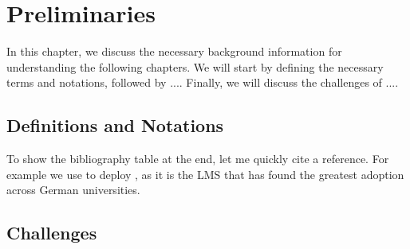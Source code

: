\documentclass[../paper.tex]{subfiles}
\begin{document}
    \section{Preliminaries}\label{ch:preliminaries}
    In this chapter, we discuss the necessary background information for understanding the following chapters. We will start by defining the necessary terms and notations, followed by .... Finally, we will discuss the challenges of ....
    \lipsum[1-2]
    \subsection{Definitions and Notations}
    To show the bibliography table at the end, let me quickly cite a reference. For example we use \cite{docker} to deploy \cite{moodle}, as it is the LMS that has found the greatest adoption across German universities\cite{statisa-LMS-market-share-germany-2024}.

    \subsection{Challenges}


    \ifSubfilesClassLoaded{%
        \printbibliography{}%
    }{}
\end{document}
